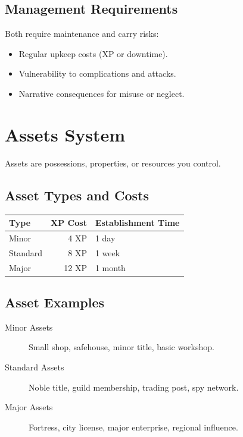 \documentclass[11pt,twoside,openany]{book}
\begin{document}
\subsection*{Management Requirements}

Both require maintenance and carry risks:
\begin{itemize}
\item Regular upkeep costs (XP or downtime).
\item Vulnerability to complications and attacks.
\item Narrative consequences for misuse or neglect.
\end{itemize}

\section*{Assets System} 

Assets are possessions, properties, or resources you control.

\subsection*{Asset Types and Costs}

\begin{center}
\begin{tabular}{|l|r|l|}
\hline
\textbf{Type} & \textbf{XP Cost} & \textbf{Establishment Time} \\
\hline
Minor & 4 XP & 1 day \\
Standard & 8 XP & 1 week \\
Major & 12 XP & 1 month \\
\hline
\end{tabular}
\end{center}

\subsection*{Asset Examples}

\begin{description}
\item[Minor Assets] Small shop, safehouse, minor title, basic workshop.
\item[Standard Assets] Noble title, guild membership, trading post, spy network.
\item[Major Assets] Fortress, city license, major enterprise, regional influence.
\end{description}
\end{document}
